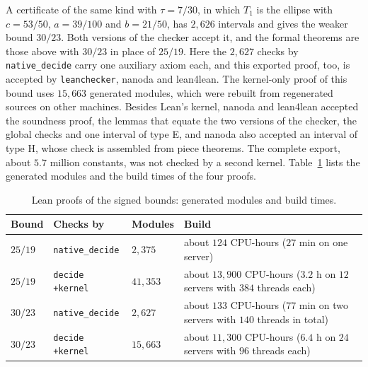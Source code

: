 \documentclass[11pt]{amsart}
\theoremstyle{definition}
\theoremstyle{remark}
\numberwithin{equation}{section}
\newcommand{\LeanSigSlash}{25/19}
\newcommand{\LeanSChecks}{2{,}375}
\newcommand{\LeanSCPU}{124}
\newcommand{\LeanSWall}{27}
\newcommand{\LeanKMods}{41{,}353}
\newcommand{\LeanKCPU}{13{,}900}
\newcommand{\LeanKWall}{3.2}
\newcommand{\LeanKServers}{12}
\newcommand{\LeanKThreads}{384}
\begin{document}
A certificate of the same kind with $\tau=7/30$, in which $T_1$ is the ellipse with $c=53/50$, $a=39/100$ and $b=21/50$, has $2{,}626$ intervals and gives the weaker bound $30/23$. Both versions of the checker accept it, and the formal theorems are those above with $30/23$ in place of $\LeanSigSlash$. Here the $2{,}627$ checks by \texttt{native\_decide} carry one auxiliary axiom each, and this exported proof, too, is accepted by \texttt{leanchecker}, nanoda and lean4lean. The kernel-only proof of this bound uses $15{,}663$ generated modules, which were rebuilt from regenerated sources on other machines. Besides Lean's kernel, nanoda and lean4lean accepted the soundness proof, the lemmas that equate the two versions of the checker, the global checks and one interval of type E, and nanoda also accepted an interval of type H, whose check is assembled from piece theorems. The complete export, about $5.7$ million constants, was not checked by a second kernel. Table~\ref{tab:lean} lists the generated modules and the build times of the four proofs.

\begin{table}[ht]
\centering
\caption{Lean proofs of the signed bounds: generated modules and build times.}\label{tab:lean}
\small
\begin{tabular}{@{}lllp{}@{}}
\toprule
Bound & Checks by & Modules & Build\\
\midrule
$\LeanSigSlash$ & \texttt{native\_decide} & $\LeanSChecks$ & about $\LeanSCPU$ CPU-hours ($\LeanSWall$ min on one server)\\
$\LeanSigSlash$ & \texttt{decide +kernel} & $\LeanKMods$ & about $\LeanKCPU$ CPU-hours ($\LeanKWall$ h on $\LeanKServers$ servers with $\LeanKThreads$ threads each)\\
$30/23$ & \texttt{native\_decide} & $2{,}627$ & about $133$ CPU-hours ($77$ min on two servers with $140$ threads in total)\\
$30/23$ & \texttt{decide +kernel} & $15{,}663$ & about $11{,}300$ CPU-hours ($6.4$ h on $24$ servers with $96$ threads each)\\
\bottomrule
\end{tabular}
\end{table}
\end{document}
